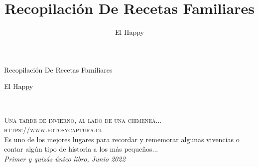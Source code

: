 \documentclass[10pt,a4paper]{report}
\title{Recopilación De Recetas Familiares}
\author{El Happy}
\begin{document}

\begingroup
\thispagestyle{empty}
\centering
\vspace*{5cm}
\par\normalfont\fontsize{35}{35}\sffamily\selectfont
{\LARGE Recopilación De Recetas Familiares}\par %
\vspace*{1cm}
{\Huge El Happy}\par %
\endgroup


\newpage
~\vfill
\thispagestyle{empty}

\noindent \textsc{Una tarde de invierno, al lado de una chimenea...}\\

\noindent \textsc{https://www.fotosycaptura.cl}\\ %

\noindent Es uno de los mejores lugares para recordar y rememorar algunas vivencias o contar algún tipo de historia a los más pequeños...\\ 

\noindent \textit{Primer y quizás único libro, Junio 2022}
\end{document}
